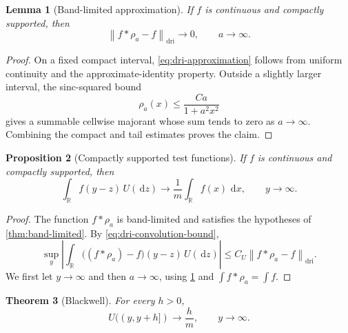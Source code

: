 \documentclass[10pt,reqno,a4paper]{amsart}
\numberwithin{equation}{section}
\theoremstyle{plain}
\newtheorem{theorem}{Theorem}[section]
\newtheorem{proposition}[theorem]{Proposition}
\newtheorem{lemma}[theorem]{Lemma}
\theoremstyle{definition}
\theoremstyle{remark}
\newcommand{\R}{\mathbb{R}}
\newcommand{\1}{\mathbf{1}}
\newcommand{\de}{\,\mathrm{d}}
\newcommand{\abs}[1]{\left|#1\right|}
\newcommand{\norm}[1]{\left\lVert#1\right\rVert}
\begin{document}
\begin{lemma}[Band-limited approximation]\label{lem:band-limited-approximation}
  If \(f\) is continuous and compactly supported, then
  \begin{equation}\label{eq:dri-approximation}
    \norm{f*\rho_a-f}_{\mathrm{dri}}\longrightarrow0,
    \qquad a\to\infty.
  \end{equation}
\end{lemma}

\begin{proof}
  On a fixed compact interval, \cref{eq:dri-approximation} follows from
  uniform continuity and the approximate-identity property.  Outside a
  slightly larger interval, the sinc-squared bound
  \begin{equation*}
    \rho_a(x)\leq\frac{Ca}{1+a^2x^2}
  \end{equation*}
  gives a summable cellwise majorant whose sum tends to zero as
  \(a\to\infty\).  Combining the compact and tail estimates proves the claim.
\end{proof}

\begin{proposition}[Compactly supported test functions]\label{prop:compact-tests}
  If \(f\) is continuous and compactly supported, then
  \begin{equation}\label{eq:compact-test-limit}
    \int_\R f(y-z)\,U(\de z)
    \longrightarrow
    \frac{1}{m}\int_\R f(x)\,\de x,
    \qquad y\to\infty.
  \end{equation}
\end{proposition}

\begin{proof}
  The function \(f*\rho_a\) is band-limited and satisfies the hypotheses of
  \cref{thm:band-limited}.  By \cref{eq:dri-convolution-bound},
  \begin{equation*}
    \sup_y
    \abs{
      \int_\R
      \bigl((f*\rho_a)-f\bigr)(y-z)\,U(\de z)
    }
    \leq
    C_U\norm{f*\rho_a-f}_{\mathrm{dri}}.
  \end{equation*}
  We first let \(y\to\infty\) and then \(a\to\infty\), using
  \cref{lem:band-limited-approximation} and
  \(\int f*\rho_a=\int f\).
\end{proof}

\begin{theorem}[Blackwell]\label{thm:blackwell}
  For every \(h>0\),
  \begin{equation}\label{eq:blackwell}
    U((y,y+h])
    \longrightarrow
    \frac{h}{m},
    \qquad y\to\infty.
  \end{equation}
\end{theorem}
\end{document}
